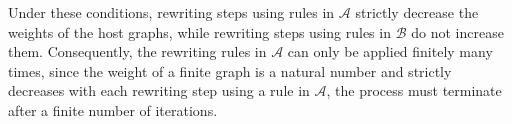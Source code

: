 Under these conditions, rewriting steps using rules in \( \mathcal{A} \) strictly decrease the weights of the host graphs, while rewriting steps using rules in \( \mathcal{B} \) do not increase them.
Consequently, the rewriting rules in \( \mathcal{A} \) can only be applied finitely many times, since the weight of a finite graph is a natural number and strictly decreases with each rewriting step using a rule in \( \mathcal{A} \), the process must terminate after a finite number of iterations.  


